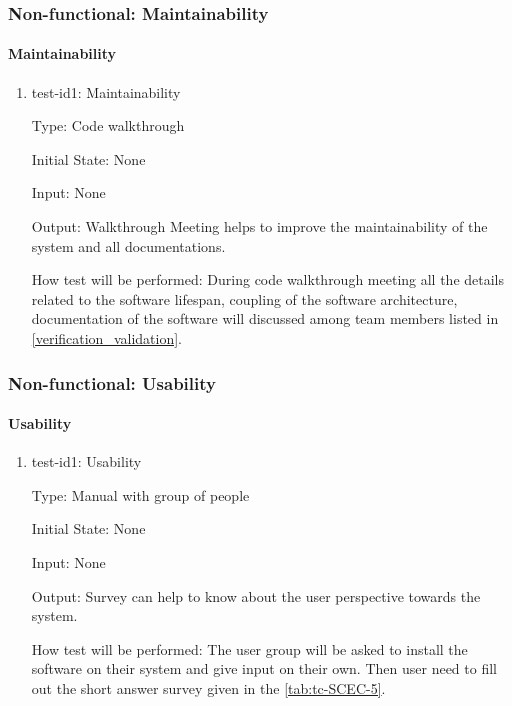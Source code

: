 \documentclass[12pt, titlepage]{article}
\begin{document}
\subsubsection{Non-functional: Maintainability}
\label{non_functional_maintainability}	
\paragraph{Maintainability}

\begin{enumerate}
					
\item{test-id1: Maintainability\\}

Type: Code walkthrough
					
Initial State: None 
					
Input: None 
					
Output: Walkthrough Meeting helps to improve the maintainability of the system and all documentations. 
					
How test will be performed: During code walkthrough meeting all the details related to the software lifespan, coupling of the software architecture, documentation of the software will discussed among team members listed in \autoref{verification_validation}.

\end{enumerate}


\subsubsection{Non-functional: Usability}
\label{non_functional_usability}	
\paragraph{Usability}

\begin{enumerate}
					
\item{test-id1: Usability\\}

Type: Manual with group of people
					
Initial State: None 
					
Input: None 
					
Output: Survey can help to know about the user perspective towards the system. 
					
How test will be performed: The user group will be asked to install the software on their system and give input on their own. Then user need to fill out the short answer survey given in the \autoref{tab:tc-SCEC-5}.

\end{enumerate}
\end{document}
